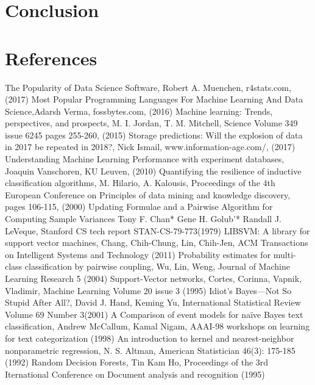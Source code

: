 \documentclass[a4paper,10pt]{article}
\begin{document}
\newpage
\section{Conclusion} \label{Chapter6}

\section{References}
\begingroup
\begin{thebibliography}{9}
 The Popularity of Data Science Software, Robert A. Muenchen, r4stats.com, (2017)
 Most Popular Programming Languages For Machine Learning And Data Science,Adarsh Verma, fossbytes.com, (2016)
Machine learning: Trends, perspectives, and prospects, M. I. Jordan, T. M. Mitchell, Science Volume 349 issue 6245 pages 255-260, (2015)
 Storage predictions: Will the explosion of data in 2017 be repeated in 2018?, Nick Ismail, www.information-age.com/, (2017)
 Understanding Machine Learning Performance with experiment databases, Joaquin Vanschoren, KU Leuven, (2010)
 Quantifying the resilience of inductive classification algorithms, M. Hilario, A. Kalousis, 
Proceedings of the 4th European Conference on Principles of data mining and knowledge discovery, pages 106-115, (2000)
Updating Formulae and a Pairwise Algorithm for Computing Sample Variances Tony F. Chan* Gene H. Golub’* Randall J. LeVeque, Stanford CS tech report STAN-CS-79-773(1979)
LIBSVM: A library for support vector machines, Chang, Chih-Chung, Lin, Chih-Jen, ACM Transactions on Intelligent Systems and Technology (2011)
 Probability estimates for multi-class classification by pairwise coupling, Wu, Lin, Weng, Journal of Machine Learning Research 5 (2004)
 Support-Vector networks, Cortes, Corinna, Vapnik, Vladimir, Machine Learning Volume 20 issue 3 (1995)
 Idiot’s Bayes—Not So Stupid After All?, David J. Hand, Keming Yu, International Statistical Review Volume 69 Number 3(2001)
 A Comparison of event models for naïve Bayes text classification, Andrew McCallum, Kamal Nigam, AAAI-98 workshops on learning for text categorization (1998)
 An introduction to kernel and nearest-neighbor nonparametric regression, N. S. Altman, American Statistician 46(3): 175-185 (1992)
 Random Decision Forests, Tin Kam Ho, Proceedings of the 3rd Iternational Conference on Document analysis and recognition (1995)

\end{thebibliography}
\end{document}
